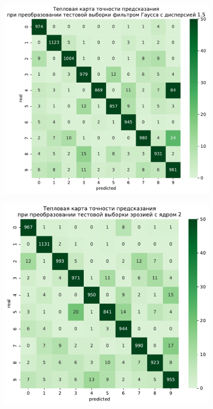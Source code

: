 \documentclass{article}
\begin{document}
\begin{figure}[h]
{\begin{minipage}{8cm}
		\end{minipage}
		\label{app6:gauss1}
	}
	\subfigure
	{
		\begin{minipage}{8cm}
			\centering
			\includegraphics[scale=0.35]{TASK1 test gaus15.pdf}
		\end{minipage}
		\label{app6:gauss15}
	}
	\subfigure
	{
		\begin{minipage}{8cm}
			\centering
			\includegraphics[scale=0.35]{TASK1 test morf1.pdf}
		\end{minipage}
		\label{app6:morf1}
	}
\end{figure}
\end{document}

